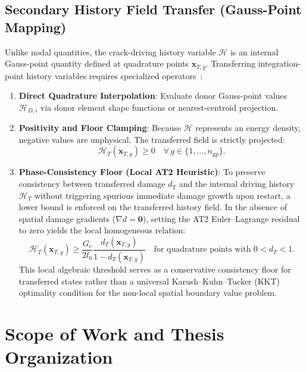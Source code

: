 \subsection{Secondary History Field Transfer (Gauss-Point Mapping)}
Unlike nodal quantities, the crack-driving history variable $\mathcal{H}$ is an internal Gauss-point quantity defined at quadrature points $\mathbf{x}_{T,g}$. Transferring integration-point history variables requires specialized operators~\cite{peric1996,jiao2004}:
\begin{enumerate}
    \item \textbf{Direct Quadrature Interpolation}: Evaluate donor Gauss-point values $\mathcal{H}_{D,i}$ via donor element shape functions or nearest-centroid projection.
    \item \textbf{Positivity and Floor Clamping}: Because $\mathcal{H}$ represents an energy density, negative values are unphysical. The transferred field is strictly projected:
    \begin{equation}
    \label{eq:history_positivity_clamp}
    \mathcal{H}_T(\mathbf{x}_{T,g}) \ge 0 \quad \forall \, g \in \{1, \dots, n_{\mathrm{gp}}\}.
    \end{equation}
    \item \textbf{Phase-Consistency Floor (Local AT2 Heuristic)}: To preserve consistency between transferred damage $d_T$ and the internal driving history $\mathcal{H}_T$ without triggering spurious immediate damage growth upon restart, a lower bound is enforced on the transferred history field. In the absence of spatial damage gradients ($\nabla d = \mathbf{0}$), setting the AT2 Euler--Lagrange residual to zero yields the local homogeneous relation:
    \begin{equation}
    \label{eq:kkt_consistency}
    \mathcal{H}_T(\mathbf{x}_{T,g}) \ge \frac{G_c}{2 l_0} \frac{d_T(\mathbf{x}_{T,g})}{1 - d_T(\mathbf{x}_{T,g})} \quad \text{for quadrature points with } 0 < d_T < 1.
    \end{equation}
    This local algebraic threshold serves as a conservative consistency floor for transferred states rather than a universal Karush--Kuhn--Tucker (KKT) optimality condition for the non-local spatial boundary value problem.
\end{enumerate}

\section{Scope of Work and Thesis Organization}
\label{sec:intro_scope_and_outline}

